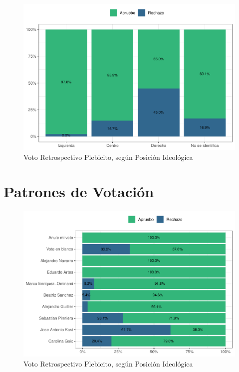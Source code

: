 \documentclass[
  12pt,
  openany]{book}
\begin{document}
\begin{figure}

{\centering \includegraphics{reporte-elsoc_files/figure-latex/id-pol-voto-1} 

}

\caption{Voto Retrospectivo Plebicito, según Posición Ideológica}\label{fig:id-pol-voto}
\end{figure}

\hypertarget{patrones-de-votaciuxf3n}{%
\section{Patrones de Votación}\label{patrones-de-votaciuxf3n}}

\begin{figure}

{\centering \includegraphics{reporte-elsoc_files/figure-latex/presi-voto-c44-1} 

}

\caption{Voto Retrospectivo Plebicito, según Posición Ideológica}\label{fig:presi-voto-c44}
\end{figure}
\end{document}

